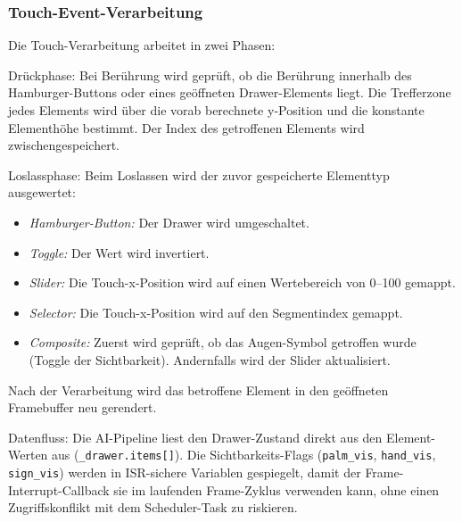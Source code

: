 \subsubsection{Touch-Event-Verarbeitung}\label{ssub:touch-event-verarbeitung}

Die Touch-Verarbeitung arbeitet in zwei Phasen:

Drückphase: Bei Berührung wird geprüft, ob die Berührung innerhalb des Hamburger-Buttons oder eines geöffneten Drawer-Elements liegt. Die Trefferzone jedes Elements wird über die vorab berechnete y-Position und die konstante Elementhöhe bestimmt. Der Index des getroffenen Elements wird zwischengespeichert.

Loslassphase: Beim Loslassen wird der zuvor gespeicherte Elementtyp ausgewertet:
\begin{itemize}
    \item \textit{Hamburger-Button:} Der Drawer wird umgeschaltet.
    \item \textit{Toggle:} Der Wert wird invertiert.
    \item \textit{Slider:} Die Touch-x-Position wird auf einen Wertebereich von 0--100 gemappt.
    \item \textit{Selector:} Die Touch-x-Position wird auf den Segmentindex gemappt.
    \item \textit{Composite:} Zuerst wird geprüft, ob das Augen-Symbol getroffen wurde (Toggle der Sichtbarkeit). Andernfalls wird der Slider aktualisiert.
\end{itemize}
Nach der Verarbeitung wird das betroffene Element in den geöffneten Framebuffer neu gerendert.

Datenfluss: Die AI-Pipeline liest den Drawer-Zustand direkt aus den Element-Werten \linebreak aus (\texttt{\_drawer.items[]}). Die Sichtbarkeits-Flags (\texttt{palm\_vis}, \texttt{hand\_vis}, \texttt{sign\_vis}) werden in ISR-sichere Variablen gespiegelt, damit der Frame-Interrupt-Callback sie im laufenden Frame-Zyklus verwenden kann, ohne einen Zugriffskonflikt mit dem Scheduler-Task zu riskieren.

